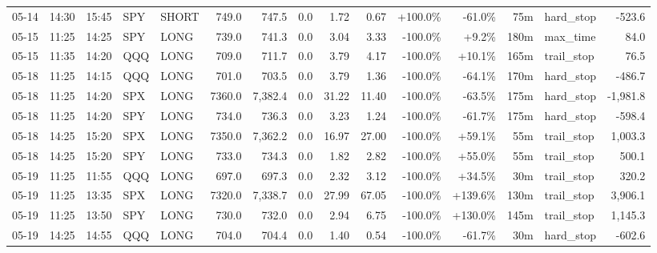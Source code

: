 \documentclass[11pt,a4paper,twoside]{article}
\begin{document}
\begin{landscape}
\begin{center}
\begin{longtable}{>{\color{txtmain}}l l l l l r r r r r r r r >{\color{txtmain}}l r}
05-14 & 14:30 & 15:45 & SPY & SHORT & 749.0 & 747.5 & 0.0 & 1.72 & 0.67 & \textcolor{wingreen}{+100.0\%} & \textcolor{lossred}{-61.0\%} & 75m & hard\_stop & \textcolor{lossred}{-523.6} \\
05-15 & 11:25 & 14:25 & SPY & LONG & 739.0 & 741.3 & 0.0 & 3.04 & 3.33 & \textcolor{lossred}{-100.0\%} & \textcolor{wingreen}{+9.2\%} & 180m & max\_time & \textcolor{wingreen}{84.0} \\
05-15 & 11:35 & 14:20 & QQQ & LONG & 709.0 & 711.7 & 0.0 & 3.79 & 4.17 & \textcolor{lossred}{-100.0\%} & \textcolor{wingreen}{+10.1\%} & 165m & trail\_stop & \textcolor{wingreen}{76.5} \\
05-18 & 11:25 & 14:15 & QQQ & LONG & 701.0 & 703.5 & 0.0 & 3.79 & 1.36 & \textcolor{lossred}{-100.0\%} & \textcolor{lossred}{-64.1\%} & 170m & hard\_stop & \textcolor{lossred}{-486.7} \\
05-18 & 11:25 & 14:20 & SPX & LONG & 7360.0 & 7,382.4 & 0.0 & 31.22 & 11.40 & \textcolor{lossred}{-100.0\%} & \textcolor{lossred}{-63.5\%} & 175m & hard\_stop & \textcolor{lossred}{-1,981.8} \\
05-18 & 11:25 & 14:20 & SPY & LONG & 734.0 & 736.3 & 0.0 & 3.23 & 1.24 & \textcolor{lossred}{-100.0\%} & \textcolor{lossred}{-61.7\%} & 175m & hard\_stop & \textcolor{lossred}{-598.4} \\
05-18 & 14:25 & 15:20 & SPX & LONG & 7350.0 & 7,362.2 & 0.0 & 16.97 & 27.00 & \textcolor{lossred}{-100.0\%} & \textcolor{wingreen}{+59.1\%} & 55m & trail\_stop & \textcolor{wingreen}{1,003.3} \\
05-18 & 14:25 & 15:20 & SPY & LONG & 733.0 & 734.3 & 0.0 & 1.82 & 2.82 & \textcolor{lossred}{-100.0\%} & \textcolor{wingreen}{+55.0\%} & 55m & trail\_stop & \textcolor{wingreen}{500.1} \\
05-19 & 11:25 & 11:55 & QQQ & LONG & 697.0 & 697.3 & 0.0 & 2.32 & 3.12 & \textcolor{lossred}{-100.0\%} & \textcolor{wingreen}{+34.5\%} & 30m & trail\_stop & \textcolor{wingreen}{320.2} \\
05-19 & 11:25 & 13:35 & SPX & LONG & 7320.0 & 7,338.7 & 0.0 & 27.99 & 67.05 & \textcolor{lossred}{-100.0\%} & \textcolor{wingreen}{+139.6\%} & 130m & trail\_stop & \textcolor{wingreen}{3,906.1} \\
05-19 & 11:25 & 13:50 & SPY & LONG & 730.0 & 732.0 & 0.0 & 2.94 & 6.75 & \textcolor{lossred}{-100.0\%} & \textcolor{wingreen}{+130.0\%} & 145m & trail\_stop & \textcolor{wingreen}{1,145.3} \\
05-19 & 14:25 & 14:55 & QQQ & LONG & 704.0 & 704.4 & 0.0 & 1.40 & 0.54 & \textcolor{lossred}{-100.0\%} & \textcolor{lossred}{-61.7\%} & 30m & hard\_stop & \textcolor{lossred}{-602.6} \\

\end{longtable}
\end{center}
\end{landscape}
\end{document}
